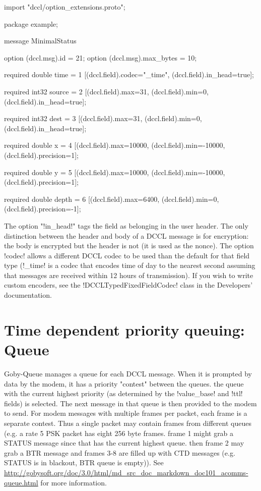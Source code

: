 \begin{boxedverbatim}
import "dccl/option_extensions.proto";

package example;

message MinimalStatus
{ 
  option (dccl.msg).id = 21;
  option (dccl.msg).max_bytes = 10;

  required double time = 1 [(dccl.field).codec="_time",
                            (dccl.field).in_head=true];
  
  required int32 source = 2 [(dccl.field).max=31,
                             (dccl.field).min=0,
                             (dccl.field).in_head=true];

  required int32 dest = 3 [(dccl.field).max=31,
                           (dccl.field).min=0,
                           (dccl.field).in_head=true];
  
  required double x = 4 [(dccl.field).max=10000,
                         (dccl.field).min=-10000,
                         (dccl.field).precision=1];
  
  required double y = 5 [(dccl.field).max=10000,
                         (dccl.field).min=-10000,
                         (dccl.field).precision=1];
  
  required double depth = 6 [(dccl.field).max=6400,
                             (dccl.field).min=0,
                             (dccl.field).precision=-1];
} 
\end{boxedverbatim}
\resetbvlinenumber

The option "!in_head!" tags the field as belonging in the user header. The only distinction between the header and body of a DCCL message is for encryption: the body is encrypted but the header is not (it is used as the nonce). The option !codec! allows a different DCCL codec to be used than the default for that field type (!_time! is a codec that encodes time of day to the nearest second assuming that messages are received within 12 hours of transmission). If you wish to write custom encoders, see the !DCCLTypedFixedFieldCodec! class in the Developers' documentation.

\section{Time dependent priority queuing: Queue} \label{sec:queue}

Goby-Queue manages a queue for each DCCL message. When it is prompted by data by the modem, it has a priority "contest" between the queues. the queue with the current highest priority (as determined by the !value_base! and !ttl! fields) is selected. The next message in that queue is then provided to the modem to send. For modem messages with multiple frames per packet, each frame is a separate contest. Thus a single packet may contain frames from different
 queues (e.g. a rate 5 PSK packet has eight 256 byte frames. frame 1 might grab a STATUS message since that has the current highest queue. then frame 2 may grab a BTR message and frames 3-8 are filled up with CTD messages (e.g. STATUS is in blackout, BTR queue is empty)). See \url{http://gobysoft.org/doc/3.0/html/md_src_doc_markdown_doc101_acomms-queue.html} for more information.

